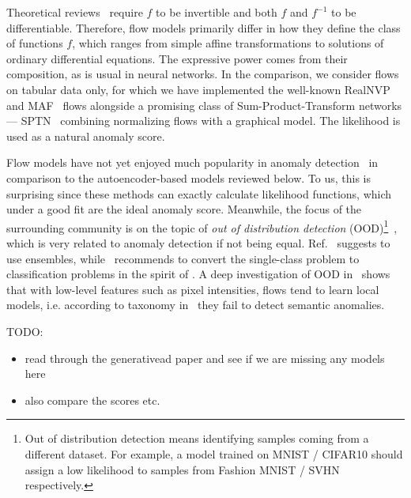 Theoretical reviews~\cite{papamakariosNormalizingFlowsProbabilistic2019, kobyzevNormalizingFlowsIntroduction2020} require $f$ to be invertible and both $f$ and $f^{-1}$ to be differentiable. Therefore, flow models primarily differ in how they define the class of functions $f$, which ranges from simple affine transformations to solutions of ordinary differential equations. The expressive power comes from their composition, as is usual in neural networks. In the comparison, we consider flows on tabular data only, for which we have implemented the well-known RealNVP~\cite{dinh2016density} and MAF~\cite{papamakariosMaskedAutoregressiveFlow2018} flows alongside a promising class of Sum-Product-Transform networks --- SPTN~\cite{pevny2020sum} combining normalizing flows with a graphical model. The likelihood is used as a natural anomaly score.

Flow models have not yet enjoyed much popularity in anomaly detection~\cite{yamaguchi2019adaflow, schmidtNormalizingFlowsNovelty2019, diasAnomalyDetectionTrajectory2020a, pevny2020sum} in comparison to the autoencoder-based models reviewed below. To us, this is surprising since these methods can exactly calculate likelihood functions, which under a good fit are the ideal anomaly score. Meanwhile, the focus of the surrounding community is on the topic of \textit{out of distribution detection} (OOD)\footnote{Out of distribution detection means identifying samples coming from a different dataset. For example, a model trained on MNIST / CIFAR10 should assign a low likelihood to samples from Fashion MNIST / SVHN respectively.}~\cite{nalisnickDeepGenerativeModels2019}, which is very related to anomaly detection if not being equal. Ref.~\cite{choiWAICWhyGenerative2019} suggests to use ensembles, while~\cite{renLikelihoodRatiosOutofDistribution2019} recommends to convert the single-class problem to classification problems in the spirit of \cite{steinwart2005a}. A deep investigation of OOD in~\cite{kirichenkoWhyNormalizingFlows2020} shows that with low-level features such as pixel intensities, flows tend to learn local models, i.e. according to taxonomy in~\cite{ruff2020unifying} they fail to detect semantic anomalies.


TODO:

\begin{itemize}
    \item read through the generativead paper and see if we are missing any models here
    \item also compare the scores etc.
\end{itemize}